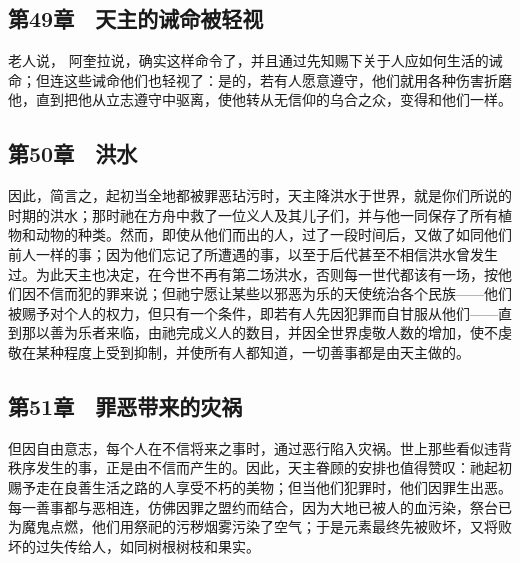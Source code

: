 
\subsection{第49章　天主的诫命被轻视}

老人说， 阿奎拉说，确实这样命令了，并且通过先知赐下关于人应如何生活的诫命；但连这些诫命他们也轻视了：是的，若有人愿意遵守，他们就用各种伤害折磨他，直到把他从立志遵守中驱离，使他转从无信仰的乌合之众，变得和他们一样。\par


\subsection{第50章　洪水}

因此，简言之，起初当全地都被罪恶玷污时，天主降洪水于世界，就是你们所说的时期的洪水；那时祂在方舟中救了一位义人及其儿子们，并与他一同保存了所有植物和动物的种类。然而，即使从他们而出的人，过了一段时间后，又做了如同他们前人一样的事；因为他们忘记了所遭遇的事，以至于后代甚至不相信洪水曾发生过。为此天主也决定，在今世不再有第二场洪水，否则每一世代都该有一场，按他们因不信而犯的罪来说；但祂宁愿让某些以邪恶为乐的天使统治各个民族——他们被赐予对个人的权力，但只有一个条件，即若有人先因犯罪而自甘服从他们——直到那以善为乐者来临，由祂完成义人的数目，并因全世界虔敬人数的增加，使不虔敬在某种程度上受到抑制，并使所有人都知道，一切善事都是由天主做的。\par


\subsection{第51章　罪恶带来的灾祸}

但因自由意志，每个人在不信将来之事时，通过恶行陷入灾祸。世上那些看似违背秩序发生的事，正是由不信而产生的。因此，天主眷顾的安排也值得赞叹：祂起初赐予走在良善生活之路的人享受不朽的美物；但当他们犯罪时，他们因罪生出恶。每一善事都与恶相连，仿佛因罪之盟约而结合，因为大地已被人的血污染，祭台已为魔鬼点燃，他们用祭祀的污秽烟雾污染了空气；于是元素最终先被败坏，又将败坏的过失传给人，如同树根树枝和果实。\par

